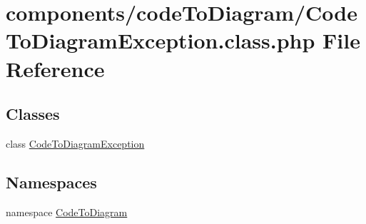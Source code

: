 \hypertarget{_code_to_diagram_exception_8class_8php}{
\section{components/codeToDiagram/CodeToDiagramException.class.php File Reference}
\label{_code_to_diagram_exception_8class_8php}
}
\subsection*{Classes}
\begin{CompactItemize}
\item 
class \hyperlink{class_code_to_diagram_exception}{CodeToDiagramException}
\end{CompactItemize}
\subsection*{Namespaces}
\begin{CompactItemize}
\item 
namespace \hyperlink{namespace_code_to_diagram}{CodeToDiagram}
\end{CompactItemize}
